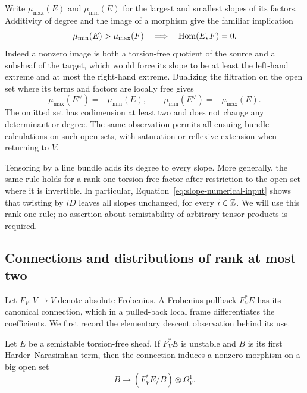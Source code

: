 Write $\mu_{\max}(E)$ and $\mu_{\min}(E)$ for the largest and smallest
slopes of its factors.  Additivity of degree and the image of a morphism
give the familiar implication
\begin{equation}
  \mu_{\min}(E)>\mu_{\max}(F)
  \quad\Longrightarrow\quad \operatorname{Hom}(E,F)=0.
  \label{eq:slope-hom-vanishing}
\end{equation}
Indeed a nonzero image is both a torsion-free quotient of the source and
a subsheaf of the target, which would force its slope to be at least the
left-hand extreme and at most the right-hand extreme.  Dualizing the
filtration on the open set where its terms and factors are locally free
gives
\[
  \mu_{\max}(E^\vee)=-\mu_{\min}(E),\qquad
  \mu_{\min}(E^\vee)=-\mu_{\max}(E).
\]
The omitted set has codimension at least two and does not change any
determinant or degree.  The same observation permits all ensuing bundle
calculations on such open sets, with saturation or reflexive extension
when returning to $V$.

Tensoring by a line bundle adds its degree to every slope.  More generally,
the same rule holds for a rank-one torsion-free factor after restriction
to the open set where it is invertible.  In particular,
Equation~\eqref{eq:slope-numerical-input} shows that twisting by $iD$ leaves
all slopes unchanged, for every $i\in\mathbb Z$.  We will use this rank-one rule;
no assertion about semistability of arbitrary tensor products is required.

\subsection{Connections and distributions of rank at most two}

Let $F_V\colon V\to V$ denote absolute Frobenius.  A Frobenius pullback
$F_V^*E$ has its canonical connection, which in a pulled-back local frame
differentiates the coefficients.  We first record the elementary descent
observation behind its use.

\begin{lemma}
\label{lem:connection-destabilization}
Let $E$ be a semistable torsion-free sheaf.  If $F_V^*E$ is unstable and
$B$ is its first Harder--Narasimhan term, then the connection induces a
nonzero morphism on a big open set
\[
  B\longrightarrow (F_V^*E/B)\otimes\Omega_V^1.
\]
\end{lemma}

